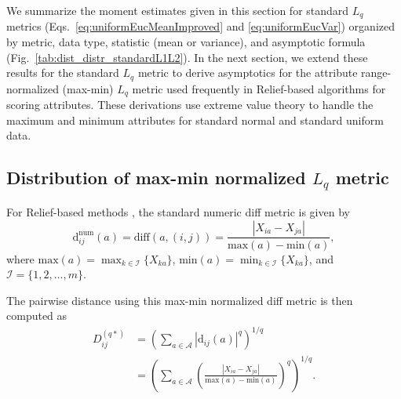 \documentclass[10pt,letterpaper]{article}
\begin{document}
We summarize the moment estimates given in this section for standard $L_q$ metrics (Eqs.~\ref{eq:uniformEucMeanImproved} and \ref{eq:uniformEucVar}) organized by metric, data type, statistic (mean or variance), and asymptotic formula (Fig.~\ref{tab:dist_distr_standardL1L2}). In the next section, we extend these results for the standard $L_q$ metric to derive asymptotics for the attribute range-normalized (max-min) $L_q$ metric used frequently in Relief-based algorithms \cite{urbanowicz17,robnik2003} for scoring attributes. These derivations use extreme value theory to handle the maximum and minimum attributes for standard normal and standard uniform data. 

\subsection*{Distribution of max-min normalized \texorpdfstring{$L_q$}{} metric}\label{sec:extremes}

For Relief-based methods \cite{robnik2003,urbanowicz17}, the standard numeric diff metric is given by
%
\begin{equation}\label{eq:normDiff}
\text{d}^{\text{num}}_{ij}(a) = \text{diff}(a,(i,j)) = \frac{|X_{ia} - X_{ja}|}{\text{max}(a) - \text{min}(a)},
\end{equation}
%
where $\text{max}(a) = \displaystyle \max_{k \in \mathcal{I}}\{X_{ka}\}$, $\text{min}(a) = \displaystyle \min_{k \in \mathcal{I}}\{X_{ka}\}$, and $\mathcal{I} = \{1,2,\dots,m\}$. 

The pairwise distance using this max-min normalized diff metric is then computed as
%
\begin{equation}\label{eq:D*}
\begin{aligned}
D^{(q*)}_{ij} &= \left(\sum_{a\in \mathcal{A}}|\text{d}_{ij}(a)|^q\right)^{1/q} \\
&= \left(\sum_{a\in \mathcal{A}}\left(\frac{|X_{ia} - X_{ja}|}{\text{max}(a) - \text{min}(a)}\right)^q\right)^{1/q}.
\end{aligned}
\end{equation}
\end{document}
